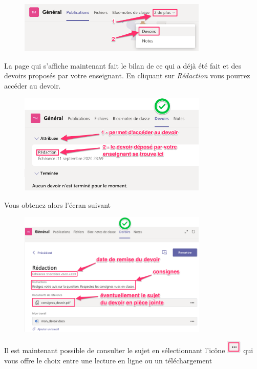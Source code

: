 \begin{figure}[H]
\includegraphics[width=9cm]{./images/teams/devoir1}
\centering
\end{figure}

La page qui s'affiche maintenant fait le bilan de ce qui a déjà été fait et des devoirs proposés par votre enseignant. En cliquant sur \textit{Rédaction} vous pourrez accéder au devoir.

\begin{figure}[H]
\includegraphics[width=9cm]{./images/teams/devoir2}
\centering
\end{figure}

Vous obtenez alors l'écran suivant

\begin{figure}[H]
\includegraphics[width=9cm]{./images/teams/devoir3}
\centering
\end{figure}

Il est maintenant possible de consulter le sujet en sélectionnant l'icône \includegraphics[width=0.7cm]{./images/teams/pointilles} qui vous offre le choix entre une lecture en ligne ou un téléchargement


